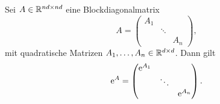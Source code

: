 \begin{lemma}\label{thm:blockdiag-exp}
    Sei $A \in \mathbb{R}^{nd \times nd}$ eine Blockdiagonalmatrix
    \begin{equation*}
        A = \begin{pmatrix}
                A_1 &        & \\
                    & \ddots & \\
                    &        & A_n
        \end{pmatrix},
    \end{equation*}
    mit quadratische Matrizen $A_1, \dots, A_n \in \mathbb{R}^{d \times d}$.
    Dann gilt
    \begin{equation*}
        \mathrm{e}^A = \begin{pmatrix}
                   \mathrm{e}^{A_1} &        & \\
                            & \ddots & \\
                            &        & \mathrm{e}^{A_n}
        \end{pmatrix}.
    \end{equation*}
\end{lemma}

